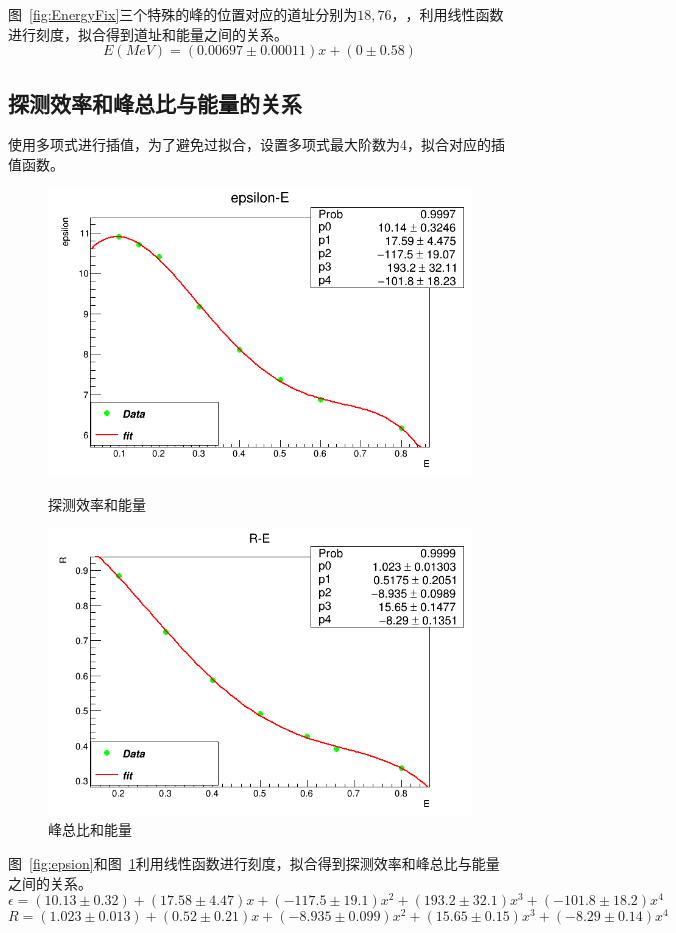 \documentclass[10pt]{ctexart}
\begin{document}
图~\ref{fig:EnergyFix}三个特殊的峰的位置对应的道址分别为$18,76，$，利用线性函数进行刻度，拟合得到道址和能量之间的关系。
\[E(MeV)=(0.00697\pm 0.00011)x+(0\pm 0.58)\]
\subsection{探测效率和峰总比与能量的关系}
\label{sec:scaleResult}
使用多项式进行插值，为了避免过拟合，设置多项式最大阶数为4，拟合对应的插值函数。
\begin{figure}[htbp]
    \centering
    \begin{minipage}{0.45\textwidth}
        \centering
        \includegraphics[width=\textwidth]{data/epsilon.png}
        \caption{探测效率和能量}
        \label{fig:epsilon}
    \end{minipage}
    \qquad
    \begin{minipage}{0.45\textwidth}
        \centering
        \includegraphics[width=\textwidth]{data/R.png}
        \caption{峰总比和能量}
        \label{fig:R}
    \end{minipage}
\end{figure}
图~\ref{fig:epsion}和图~\ref{fig:R}利用线性函数进行刻度，拟合得到探测效率和峰总比与能量之间的关系。
\[\epsilon=(10.13\pm0.32)+(17.58\pm 4.47)x+(-117.5\pm19.1)x^2+(193.2\pm32.1)x^3+(-101.8\pm18.2)x^4\]
\[R=(1.023\pm0.013)+(0.52\pm 0.21)x+(-8.935\pm0.099)x^2+(15.65\pm0.15)x^3+(-8.29\pm0.14)x^4\]
\end{document}
